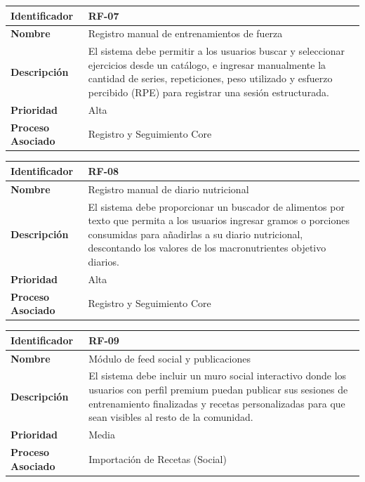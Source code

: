 \documentclass[12pt]{article}
\begin{document}
\begin{table}[h!]
    \centering
    \renewcommand{\arraystretch}{1.3}
    \begin{tabular}{|p{3.5cm}|p{11.5cm}|}
        \hline
        \rowcolor[HTML]{EFEFEF} 
        \textbf{Identificador} & \textbf{RF-07} \\ \hline
        \textbf{Nombre} & Registro manual de entrenamientos de fuerza \\ \hline
        \textbf{Descripción} & El sistema debe permitir a los usuarios buscar y seleccionar ejercicios desde un catálogo, e ingresar manualmente la cantidad de series, repeticiones, peso utilizado y esfuerzo percibido (RPE) para registrar una sesión estructurada. \\ \hline
        \textbf{Prioridad} & Alta \\ \hline
        \textbf{Proceso Asociado} & Registro y Seguimiento Core \\ \hline
    \end{tabular}
\end{table}

\begin{table}[h!]
    \centering
    \renewcommand{\arraystretch}{1.3}
    \begin{tabular}{|p{3.5cm}|p{11.5cm}|}
        \hline
        \rowcolor[HTML]{EFEFEF} 
        \textbf{Identificador} & \textbf{RF-08} \\ \hline
        \textbf{Nombre} & Registro manual de diario nutricional \\ \hline
        \textbf{Descripción} & El sistema debe proporcionar un buscador de alimentos por texto que permita a los usuarios ingresar gramos o porciones consumidas para añadirlas a su diario nutricional, descontando los valores de los macronutrientes objetivo diarios. \\ \hline
        \textbf{Prioridad} & Alta \\ \hline
        \textbf{Proceso Asociado} & Registro y Seguimiento Core \\ \hline
    \end{tabular}
\end{table}

\begin{table}[h!]
    \centering
    \renewcommand{\arraystretch}{1.3}
    \begin{tabular}{|p{3.5cm}|p{11.5cm}|}
        \hline
        \rowcolor[HTML]{EFEFEF} 
        \textbf{Identificador} & \textbf{RF-09} \\ \hline
        \textbf{Nombre} & Módulo de feed social y publicaciones \\ \hline
        \textbf{Descripción} & El sistema debe incluir un muro social interactivo donde los usuarios con perfil premium puedan publicar sus sesiones de entrenamiento finalizadas y recetas personalizadas para que sean visibles al resto de la comunidad. \\ \hline
        \textbf{Prioridad} & Media \\ \hline
        \textbf{Proceso Asociado} & Importación de Recetas (Social) \\ \hline
    \end{tabular}
\end{table}
\end{document}
